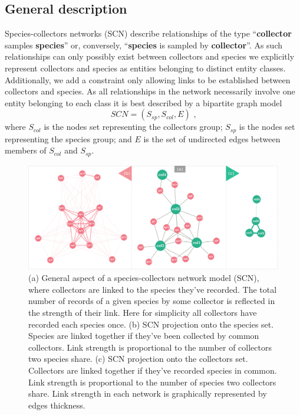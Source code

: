 


\subsection{General description}

Species-collectors networks (SCN) describe relationships of the type ``\textbf{collector} samples \textbf{species}'' or, conversely, ``\textbf{species} is sampled by \textbf{collector}''. 
As such relationships can only possibly exist between collectors and species we explicitly represent collectors and species as entities belonging to distinct entity classes. Additionally, we add a constraint only allowing links to be established between collectors and species.
As all relationships in the network necessarily involve one entity belonging to each class it is best described by a bipartite graph model
$$ SCN = (S_{sp},S_{col},E) \mbox{ ,}$$
where $S_{col}$ is the nodes set representing the collectors group; $S_{sp}$ is the nodes set representing the species group; and $E$ is the set of undirected edges between members of $S_{col}$ and $S_{sp}$.

  \begin{figure}[h!]
  	\centering
    \includegraphics[width=\linewidth]{figures/scn_generalaspect.png}
    \caption{(a) General aspect of a species-collectors network model (SCN), where collectors are linked to the species they've recorded. The total number of records of a given species by some collector is reflected in the strength of their link. Here for simplicity all collectors have recorded each species once. (b) SCN projection onto the species set. Species are linked together if they've been collected by common collectors. Link strength is proportional to the number of collectors two species share. (c) SCN projection onto the collectors set. Collectors are linked together if they've recorded species in common. Link strength is proportional to the number of species two collectors share. Link strength in each network is graphically represented by edges thickness.}
    \label{fig:scn_general}
  \end{figure}

